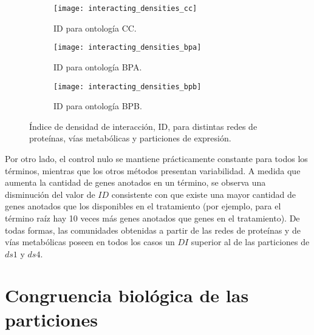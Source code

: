 \begin{figure*}[t!]
    \centering
    \begin{subfigure}[t]{0.5\textwidth}
    \centering
    \texttt{[image: interacting\_densities\_cc]}
    \caption{ID para ontología CC.}
    \end{subfigure}
    \begin{subfigure}[t]{0.5\textwidth}
    \centering
    \texttt{[image: interacting\_densities\_bpa]}
    \caption{ID para ontología BPA.}
    \end{subfigure}
    \begin{subfigure}[t]{0.5\textwidth}
    \centering
    \texttt{[image: interacting\_densities\_bpb]}
    \caption{ID para ontología BPB.}
    \end{subfigure}    
    \caption{Índice de densidad de interacción, ID, para distintas redes de proteínas, vías metabólicas y particiones de expresión.}
    \label{interacting_densities}
\end{figure*}

Por otro lado, el control nulo se mantiene prácticamente constante para todos los términos, mientras que los otros métodos presentan variabilidad. A medida que aumenta la cantidad de genes anotados en un término, se observa una disminución del valor de $ID$ consistente con que existe una mayor cantidad de genes anotados que los disponibles en el tratamiento (por ejemplo, para el término raíz hay 10 veces más genes anotados que genes en el tratamiento). De todas formas, las comunidades obtenidas a partir de las redes de proteínas y de vías metabólicas poseen en todos los casos un $DI$ superior al de las particiones de $ds1$ y $ds4$.

\section{Congruencia biológica de las particiones}

